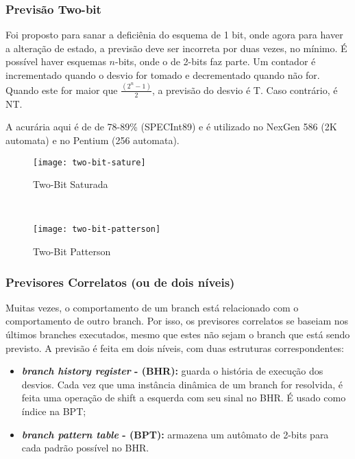 \subsubsection{Previsão Two-bit}
Foi proposto para sanar a deficiênia do esquema de 1 bit, onde agora para haver a alteração de estado, a previsão deve ser incorreta por duas vezes, no mínimo. É possível haver esquemas $n$-bits, onde o de 2-bits faz parte. Um contador é incrementado quando o desvio for tomado e decrementado quando não for. Quando este for maior que $\frac{(2^n - 1)}{2}$, a previsão do desvio é T. Caso contrário, é NT.

A acurária aqui é de de 78-89\% (SPECInt89) e é utilizado no NexGen 586 (2K automata) e no Pentium (256 automata).

\begin{figure*}
  \begin{subfigure}{.5\textwidth}
    \centering
    \texttt{[image: two-bit-sature]}
    \caption{Two-Bit Saturada}
    \label{fig:two-bit-sature}
  \end{subfigure}
  ~
  \begin{subfigure}{.5\textwidth}
    \centering
    \texttt{[image: two-bit-patterson]}
    \caption{Two-Bit Patterson}
    \label{fig:two-bit-patterson}
  \end{subfigure}
\end{figure*}




\subsubsection{Previsores Correlatos (ou de dois níveis)}
Muitas vezes, o comportamento de um branch está relacionado com o comportamento de outro branch. Por isso, os previsores correlatos se baseiam nos últimos branches executados, mesmo que estes não sejam o branch que está sendo previsto. A previsão é feita em dois níveis, com duas estruturas correspondentes:
\begin{itemize}
  \item \textbf{\textit{branch history register} - (BHR):} guarda o história de execução dos desvios. Cada vez que uma instância dinâmica de um branch for resolvida, é feita uma operação de shift a esquerda com seu sinal no BHR. É usado como índice na BPT;

  \item \textbf{\textit{branch pattern table} - (BPT):} armazena um autômato de 2-bits para cada padrão possível no BHR.
\end{itemize}

